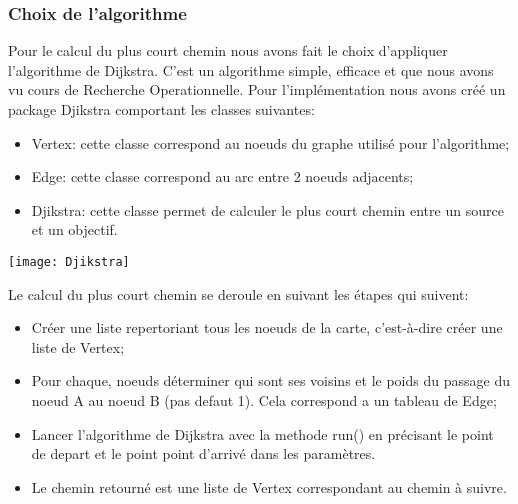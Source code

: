 \subsubsection{Choix de l'algorithme}

Pour le calcul du plus court chemin nous avons fait le choix d'appliquer l'algorithme de Dijkstra. C'est un algorithme simple, efficace et que nous avons vu cours de Recherche Operationnelle. Pour l'implémentation nous avons créé un package Djikstra comportant les classes suivantes:
\begin{itemize}
	\item Vertex: cette classe correspond au noeuds du graphe utilisé pour l'algorithme;
	\item Edge: cette classe correspond au arc entre 2 noeuds adjacents;
	\item Djikstra: cette classe permet de calculer le plus court chemin entre un source et un objectif.
\end{itemize}

\centerline{\texttt{[image: Djikstra]}}

Le calcul du plus court chemin se deroule en suivant les étapes qui suivent:
\begin{itemize}
	\item Créer une liste repertoriant tous les noeuds de la carte, c'est-à-dire créer une liste de Vertex;
	\item Pour chaque, noeuds déterminer qui sont ses voisins et le poids du passage du noeud A au noeud B (pas defaut 1). Cela correspond a un tableau de Edge;
	\item Lancer l'algorithme de Dijkstra avec la methode run() en précisant le point de depart et le point point d'arrivé dans les paramètres. 
	\item Le chemin retourné est une liste de Vertex correspondant au chemin à suivre.
\end{itemize}